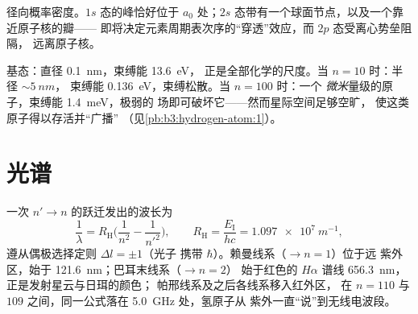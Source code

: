 \begin{omfigure}

{\small 径向概率密度。$1s$ 态的峰恰好位于
$a_0$ 处；$2s$ 态带有一个球面节点，以及一个靠近原子核的瓣——
即将决定元素周期表次序的“穿透”效应，而
$2p$ 态受离心势垒阻隔，
远离原子核。}
\end{omfigure}

\begin{example}[读取尺寸]\label{ex:b3:hydrogen-atom:sizes}
基态：直径 \qty{0.1}{nm}，束缚能 \qty{13.6}{eV}，
正是全部化学的尺度。当 $n = 10$ 时：半径 $\sim\qty{5}{nm}$，
束缚能 \qty{0.136}{eV}，束缚松散。当 $n = 100$ 时：一个
\emph{微米}量级的原子，束缚能 \qty{1.4}{meV}，极弱的
场即可破坏它——然而星际空间足够空旷，
使这类原子得以存活并“广播”
（见\cref{pb:b3:hydrogen-atom:1}）。
\end{example}

\section{光谱}

\begin{proposition}[线系与选择定则]\label{prop:b3:hydrogen-atom:series}
一次 $n' \to n$ 的跃迁发出的波长为
\[
\frac{1}{\lambda} = R_{\text{H}}\Big(\frac{1}{n^2} -
\frac{1}{n'^2}\Big) , \qquad
R_{\text{H}} = \frac{E_{\text{I}}}{hc} = \qty{1.097e7}{m^{-1}} ,
\]
遵从偶极选择定则 $\Delta l = \pm1$（光子
携带 $\hbar$）。赖曼线系（$\to n = 1$）位于远
紫外区，始于 \qty{121.6}{nm}；巴耳末线系（$\to n = 2$）
始于红色的 $H\alpha$ 谱线 \qty{656.3}{nm}，正是发射星云与日珥的颜色；
帕邢线系及之后各线系移入红外区，
在 $n = 110$ 与 $109$ 之间，同一公式落在
\qty{5.0}{GHz} 处，氢原子从
紫外一直“说”到无线电波段。
\end{proposition}


